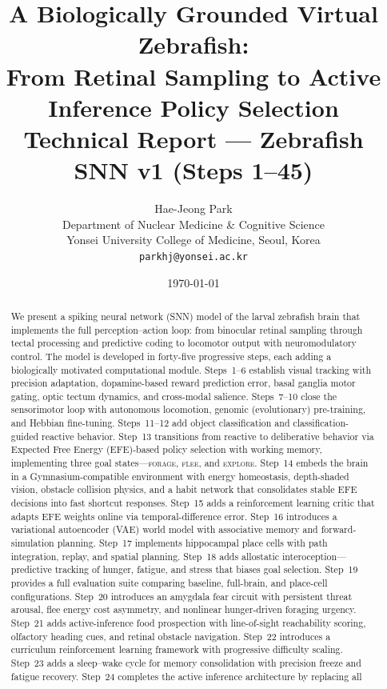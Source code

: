 \documentclass[11pt,a4paper]{article}
\title{%
  \textbf{A Biologically Grounded Virtual Zebrafish:\\
  From Retinal Sampling to Active Inference Policy Selection}\\[8pt]
  \large Technical Report --- Zebrafish SNN v1 (Steps 1--45)
}
\author{Hae-Jeong Park\\
  Department of Nuclear Medicine \& Cognitive Science\\
  Yonsei University College of Medicine, Seoul, Korea\\
  \texttt{parkhj@yonsei.ac.kr}
}
\date{\today}
\begin{document}
\maketitle

\begin{abstract}
We present a spiking neural network (SNN) model of the larval zebrafish brain
that implements the full perception--action loop: from binocular retinal
sampling through tectal processing and predictive coding to locomotor output
with neuromodulatory control.
The model is developed in forty-five progressive steps, each adding a
biologically motivated computational module.
Steps~1--6 establish visual tracking with precision adaptation, dopamine-based
reward prediction error, basal ganglia motor gating, optic tectum dynamics,
and cross-modal salience.
Steps~7--10 close the sensorimotor loop with autonomous locomotion,
genomic (evolutionary) pre-training, and Hebbian fine-tuning.
Steps~11--12 add object classification and classification-guided reactive
behavior.
Step~13 transitions from reactive to deliberative behavior via Expected Free
Energy (EFE)-based policy selection with working memory, implementing three
goal states---\textsc{forage}, \textsc{flee}, and \textsc{explore}.
Step~14 embeds the brain in a Gymnasium-compatible environment with energy
homeostasis, depth-shaded vision, obstacle collision physics, and a habit
network that consolidates stable EFE decisions into fast shortcut responses.
Step~15 adds a reinforcement learning critic that adapts EFE weights online
via temporal-difference error.
Step~16 introduces a variational autoencoder (VAE) world model with
associative memory and forward-simulation planning.
Step~17 implements hippocampal place cells with path integration, replay, and
spatial planning.
Step~18 adds allostatic interoception---predictive tracking of hunger,
fatigue, and stress that biases goal selection.
Step~19 provides a full evaluation suite comparing baseline, full-brain, and
place-cell configurations.
Step~20 introduces an amygdala fear circuit with persistent threat arousal,
flee energy cost asymmetry, and nonlinear hunger-driven foraging urgency.
Step~21 adds active-inference food prospection with line-of-sight
reachability scoring, olfactory heading cues, and retinal obstacle navigation.
Step~22 introduces a curriculum reinforcement learning framework with
progressive difficulty scaling.
Step~23 adds a sleep--wake cycle for memory consolidation with precision
freeze and fatigue recovery.
Step~24 completes the active inference architecture by replacing all

\end{abstract}
\end{document}
